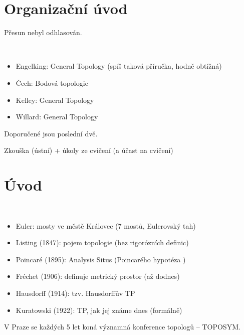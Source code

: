 \documentclass[12pt]{article}					%
\begin{document}
\section{Organizační úvod}
    Přesun nebyl odhlasován.

    \begin{poznamka}[Literatura]
        \ 
        \begin{itemize}
            \item Engelking: General Topology (spíš taková příručka, hodně obtížná)
            \item Čech: Bodová topologie
            \item Kelley: General Topology
            \item Willard: General Topology
        \end{itemize}
        Doporučené jsou poslední dvě.
    \end{poznamka}

    \begin{poznamka}
        Zkouška (ústní) + úkoly ze cvičení (a účast na cvičení)
    \end{poznamka}

\section{Úvod}

    \begin{poznamka}[Historie]
        \ 
        \begin{itemize}
            \item Euler: mosty ve městě Královec (7 mostů, Eulerovský tah)
            \item Listing (1847): pojem topologie (bez rigorózních definic)
            \item Poincaré (1895): Analysis Situs (Poincarého hypotéza )
            \item Fréchet (1906): definuje metrický prostor (až dodnes)
            \item Hausdorff (1914): tzv. Hausdorffův TP
            \item Kuratowski (1922): TP, jak jej známe dnes (formálně)
        \end{itemize}
    \end{poznamka}

    \begin{poznamka}[TOPOSYM]
        V Praze se každých 5 let koná významná konference topologů -- TOPOSYM.
    \end{poznamka}
\end{document}
